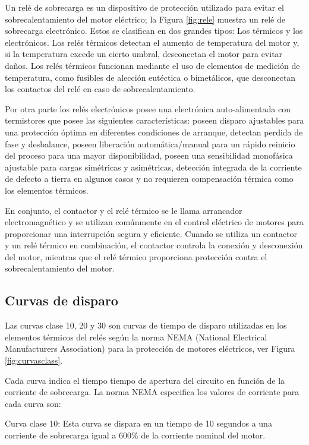 Un relé de sobrecarga es un dispositivo de protección utilizado para evitar el sobrecalentamiento del motor eléctrico; la Figura \ref{fig:rele} muestra un relé de sobrecarga electrónico. Estos se clasifican en dos grandes tipos: Los térmicos y los electrónicos. Los relés térmicos detectan el aumento de temperatura del motor y, si la temperatura excede un cierto umbral, desconectan el motor para evitar daños. Los relés térmicos funcionan mediante el uso de elementos de medición de temperatura, como fusibles de alección eutéctica o bimetálicos, que desconectan los contactos del relé en caso de sobrecalentamiento.

Por otra parte los relés electrónicos posee una electrónica auto-alimentada con termistores que posee las siguientes características: poseen disparo ajustables para una protección óptima en diferentes condiciones de arranque, detectan  perdida de fase y desbalance, poseen liberación automática/manual para un rápido reinicio del proceso para una mayor disponibilidad, poseen una sensibilidad monofásica ajustable para cargas simétricas y asimétricas, detección integrada de la corriente de defecto a tierra en algunos casos y no requieren compensación térmica como los elementos térmicos. 


En conjunto, el contactor y el relé térmico se le llama arrancador electromagnético y se utilizan comúnmente en el control eléctrico de motores para proporcionar una interrupción segura y eficiente. Cuando se utiliza un contactor y un relé térmico en combinación, el contactor controla la conexión y desconexión del motor, mientras que el relé térmico proporciona protección contra  el sobrecalentamiento del motor.

\subsection{Curvas de disparo}

Las curvas clase 10, 20 y 30 son curvas de tiempo de disparo utilizadas en los elementos térmicos del relés según la norma NEMA (National Electrical Manufacturers Association) para la protección de motores eléctricos, ver Figura \ref{fig:curvasclass}.

Cada curva indica el tiempo tiempo de apertura del circuito  en función de la corriente de sobrecarga. La norma NEMA especifica los valores de corriente para cada curva son:

Curva clase 10: Esta curva se dispara en un tiempo de 10 segundos a una corriente de sobrecarga igual a 600\% de la corriente nominal del motor.

